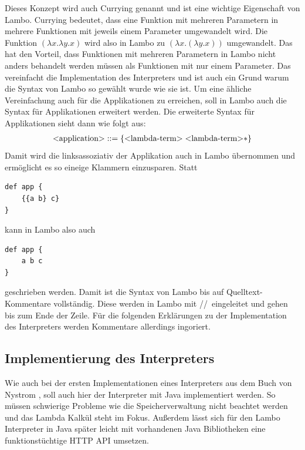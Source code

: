 \documentclass[ngerman]{article}
\begin{document}
Dieses Konzept wird auch Currying genannt und ist eine wichtige Eigenschaft von Lambo. Currying bedeutet, dass eine Funktion mit mehreren Parametern in mehrere Funktionen mit jeweils einem Parameter umgewandelt wird. Die Funktion $(\lambda x.\lambda y.x)$ wird also in Lambo zu $(\lambda x.(\lambda y.x))$ umgewandelt. Das hat den Vorteil, dass Funktionen mit mehreren Parametern in Lambo nicht anders behandelt werden müssen als Funktionen mit nur einem Parameter. Das vereinfacht die Implementation des Interpreters und ist auch ein Grund warum die Syntax von Lambo so gewählt wurde wie sie ist. Um eine ähliche Vereinfachung auch für die Applikationen zu erreichen, soll in Lambo auch die Syntax für Applikationen erweitert werden. Die erweiterte Syntax für Applikationen sieht dann wie folgt aus:
\begin{align*}
    \text{\textless application\textgreater} & ::= \{\text{\textless lambda-term\textgreater} \; \text{\textless lambda-term\textgreater}*\} \\
\end{align*}
Damit wird die linksassoziativ der Applikation auch in Lambo übernommen und ermöglicht es so eineige Klammern einzusparen. Statt
\begin{lstlisting}
def app {
    {{a b} c}
}
\end{lstlisting}
kann in Lambo also auch
\begin{lstlisting}
def app {
    a b c
}
\end{lstlisting}
geschrieben werden. Damit ist die Syntax von Lambo bis auf Quelltext-Kommentare vollständig. Diese werden in Lambo mit \slash\slash\ eingeleitet und gehen bis zum Ende der Zeile. Für die folgenden Erklärungen zu der Implementation des Interpreters werden Kommentare allerdings ingoriert.

\subsection{Implementierung des Interpreters}

\captionsetup{labelformat=empty}
\lstset{
    language=Java,
    frame=single,
    breaklines=true,
    numbers=left,
    stepnumber=1,
    showstringspaces=false,
    tabsize=1,
    breaklines=true,
    breakatwhitespace=false,
    xleftmargin=.1\textwidth,
    xrightmargin=.1\textwidth
}

Wie auch bei der ersten Implementationen eines Interpreters aus dem Buch von Nystrom \cite[Kap. 4-13]{nystrom}, soll auch hier der Interpreter mit Java implementiert werden. So müssen schwierige Probleme wie die Speicherverwaltung nicht beachtet werden und das Lambda Kalkül steht im Fokus. Außerdem lässt sich für den Lambo Interpreter in Java später leicht mit vorhandenen Java Bibliotheken eine funktionstüchtige HTTP API umsetzen.
\end{document}
